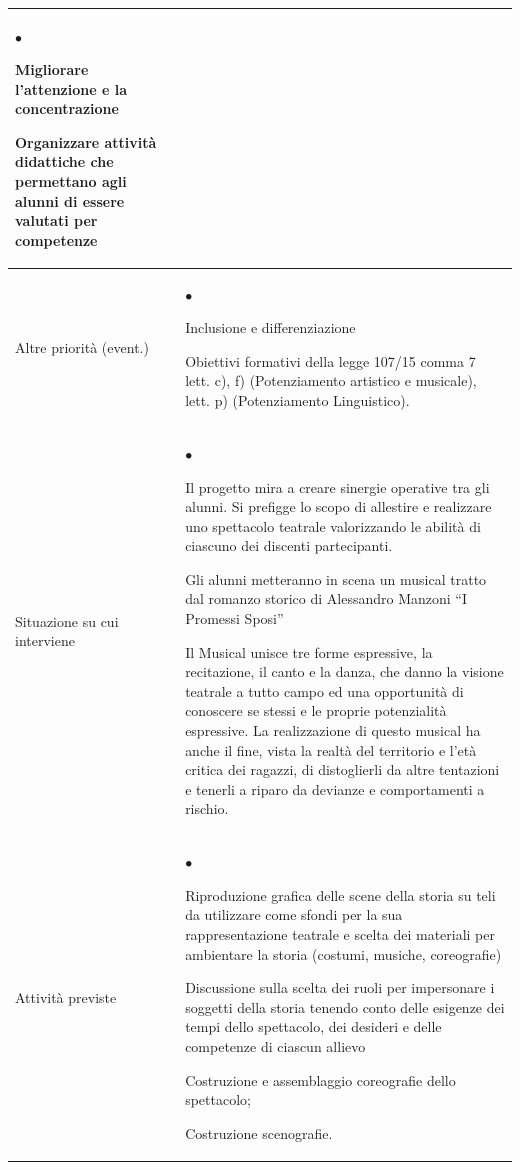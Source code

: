 \documentclass[12pt,a4paper,oneside]{memoir}
\newenvironment{elenco}{\begin{list}{$\bullet$}{%
              \setlength{\leftmargin}{4mm}%
              \setlength{\rightmargin}{1mm}%
               \setlength{\itemindent}{0mm}%
               \setlength{\labelwidth}{2mm}%
               \setlength{\labelsep}{2mm}%
              \setlength{\itemsep}{-\parsep}%
              \setlength{\partopsep}{0pt}%
              \setlength{\topsep}{0pt}%
             \setlength{\parskip}{0pt}%
              }}{\end{list}}
\begin{document}
\begin{footnotesize}
\begin{longtable}{|>{\raggedright}p{2.5cm}|>{\raggedright\arraybackslash}P{10cm}|}
\begin{elenco}
\item Migliorare l'attenzione e la concentrazione
\item Organizzare attività didattiche che permettano agli alunni di essere valutati per competenze
\end{elenco}\\[-4mm] \hline
Altre priorità (event.)&
\begin{elenco}
\item Inclusione e differenziazione 
\item Obiettivi formativi della legge 107/15 comma 7 lett. c), f) (Potenziamento artistico e musicale), lett. p) (Potenziamento Linguistico).
\end{elenco}\\[-4mm] \hline
Situazione su cui interviene&
\begin{elenco}
\item Il progetto mira a creare sinergie operative tra gli alunni. Si prefigge lo scopo di allestire e realizzare uno spettacolo teatrale valorizzando le abilità di ciascuno dei discenti partecipanti.
\item Gli alunni metteranno in scena un musical tratto dal romanzo storico di Alessandro Manzoni “I Promessi Sposi”
\item Il Musical unisce tre forme espressive, la recitazione, il canto e la danza, che danno la visione teatrale a tutto campo ed una opportunità di conoscere se stessi e le proprie potenzialità espressive. La realizzazione di questo musical ha anche il fine, vista la realtà del territorio e l'età critica dei ragazzi, di distoglierli da altre tentazioni e tenerli a riparo da devianze e comportamenti a rischio.
\end{elenco}\\[-4mm] \hline
Attività previste&
\begin{elenco}
\item Riproduzione grafica delle scene della storia su teli da utilizzare come sfondi per la sua rappresentazione teatrale e scelta dei materiali per ambientare la storia (costumi, musiche, coreografie)
\item Discussione sulla scelta dei ruoli per impersonare i soggetti della storia tenendo conto delle esigenze dei tempi dello spettacolo, dei desideri e delle competenze di ciascun allievo 
\item Costruzione e assemblaggio coreografie dello spettacolo;
\item Costruzione scenografie.
\end{elenco}\\[-4mm] \hline

\end{longtable}
\end{footnotesize}
\end{document}
